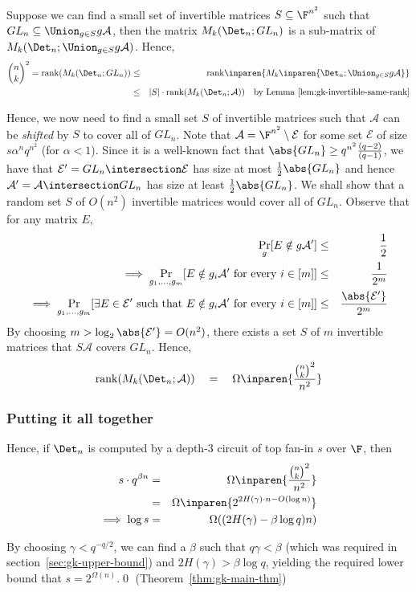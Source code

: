 Suppose we can find a small set of invertible matrices $S \subseteq
\F^{n^2}$ such that $GL_n \subseteq \Union_{g\in S} g\mathcal{A}$,
then the matrix $M_k(\Det_n; GL_n)$ is a sub-matrix of $M_k(\Det_n;
\Union_{g\in S} g\mathcal{A})$. Hence, 
\begin{eqnarray*}
  \binom{n}{k}^2 = \mathrm{rank}(M_k(\Det_n;GL_n)) & \leq & \mathrm{rank}\inparen{M_k\inparen{\Det_n;\Union_{g\in S}g\mathcal{A}}}\\
  & \leq & |S| \cdot \mathrm{rank}(M_k(\Det_n;\mathcal{A}))\quad\text{by Lemma~\ref{lem:gk-invertible-same-rank}}
\end{eqnarray*}

Hence, we now need to find a small set $S$ of invertible matrices such
that $\mathcal{A}$ can be \emph{shifted} by $S$ to cover all of
$GL_n$. Note that $\mathcal{A} = \F^{n^2} \setminus \mathcal{E}$ for
some set $\mathcal{E}$ of size $s\alpha^nq^{n^2}$ (for $\alpha <
1$). Since it is a well-known fact that $\abs{GL_n} \geq
q^{n^2}\frac{(q-2)}{(q-1)}$, we have that $\mathcal{E}' = GL_n
\intersection \mathcal{E}$ has size at most $\frac{1}{2} \abs{GL_n}$
and hence $\mathcal{A}' = \mathcal{A}\intersection GL_n$ has size at
least $\frac{1}{2}\abs{GL_n}$. We shall show that a random set $S$ of
$O(n^2)$ invertible matrices would cover all of $GL_n$. Observe that
for any matrix $E$,
\begin{eqnarray*}
  \Pr_g[E \notin g\mathcal{A}'] &\leq& \frac{1}{2}\\
  \implies \Pr_{g_1,\dots, g_m}[E \notin g_i\mathcal{A}'\text{ for every } i\in [m]] & \leq & \frac{1}{2^m}\\
  \implies \Pr_{g_1,\dots, g_m}[\exists E\in \mathcal{E}'\text{ such that }E \notin g_i\mathcal{A}'\text{ for every } i\in [m]] & \leq & \frac{\abs{\mathcal{E}'}}{2^m}
\end{eqnarray*}
By choosing $m > \log_2 \abs{\mathcal{E}'} = O(n^2)$, there exists a
set $S$ of $m$ invertible matrices that $S\mathcal{A}$ covers $GL_n$. Hence, 
$$
\mathrm{rank}(M_k(\Det_n;\mathcal{A})) \quad = \quad \Omega\inparen{\frac{\binom{n}{k}^2}{n^2}}
$$

\subsubsection{Putting it all together}

Hence, if $\Det_n$ is computed by a depth-3 circuit of top fan-in $s$ over $\F$, then 
\begin{eqnarray*}
s \cdot q^{\beta n} & = &  \Omega\inparen{\frac{\binom{n}{k}^2}{n^2}}\\
 & = & \Omega\inparen{2^{2H(\gamma)\cdot n - O(\log n)}}\\
\implies \log s & = & \Omega((2H(\gamma) - \beta \log q)n)
\end{eqnarray*}

By choosing $\gamma < q^{-q/2}$, we can find a $\beta$ such that
$q\gamma < \beta$ (which was required in
section~\ref{sec:gk-upper-bound}) and $2H(\gamma) > \beta \log q$,
yielding the required lower bound that $s = 2^{\Omega(n)}$.\qed
(Theorem~\ref{thm:gk-main-thm})


